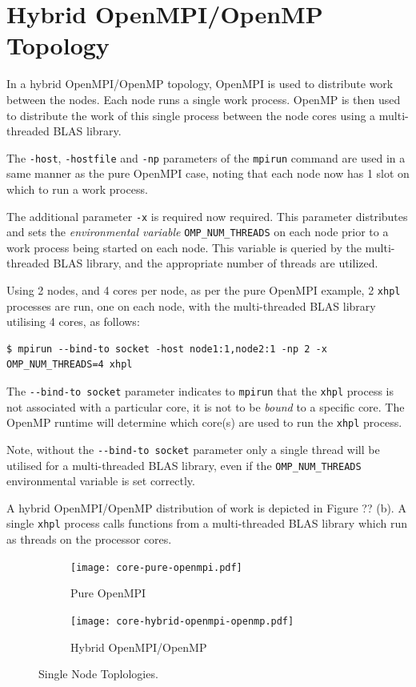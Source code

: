 \documentclass{report}
\begin{document}
%
%
\section{Hybrid OpenMPI/OpenMP Topology}
In a hybrid OpenMPI/OpenMP topology, OpenMPI is used to distribute work between the nodes. Each node runs a single work process. OpenMP is then used to distribute the work of this single process between the node cores using a multi-threaded BLAS library.

The \verb|-host|, \verb|-hostfile| and \verb|-np| parameters of the \verb|mpirun| command are used in a same manner as the pure OpenMPI case, noting that each node now has 1 slot on which to run a work process.

The additional parameter \verb|-x| is required now required. This parameter distributes and sets the \emph{environmental variable} \verb|OMP_NUM_THREADS| on each node prior to a work process being started on each node. This variable is queried by the multi-threaded BLAS library, and the appropriate number of threads are utilized.

Using 2 nodes, and 4 cores per node, as per the pure OpenMPI example, 2 \verb|xhpl| processes are run, one on each node, with the multi-threaded BLAS library utilising 4 cores, as follows:

\lstset{style=type}
\begin{lstlisting}
$ mpirun --bind-to socket -host node1:1,node2:1 -np 2 -x OMP_NUM_THREADS=4 xhpl
\end{lstlisting}

The \verb|--bind-to socket| parameter indicates to \verb|mpirun| that the \verb|xhpl| process is not associated with a particular core, it is not to be \emph{bound} to a specific core. The OpenMP runtime will determine which core(s) are used to run the \verb|xhpl| process.

Note, without the \verb|--bind-to socket| parameter only a single thread will be utilised for a multi-threaded BLAS library, even if the \verb|OMP_NUM_THREADS| environmental variable is set correctly.

A hybrid OpenMPI/OpenMP distribution of work is depicted in Figure ?? (b). A single \verb|xhpl| process calls functions from a multi-threaded BLAS library which run as threads on the processor cores.

\begin{figure}
	\begin{subfigure}{1.0\textwidth}
		\centering
		\texttt{[image: core-pure-openmpi.pdf]}
		\caption{Pure OpenMPI}
		\label{fig:subim1}
	\end{subfigure}
	\par\bigskip
	\begin{subfigure}{1.0\textwidth}
		\centering
		\texttt{[image: core-hybrid-openmpi-openmp.pdf]}
		\caption{Hybrid OpenMPI/OpenMP}
		\label{fig:subim2}
	\end{subfigure}
\caption{Single Node Toplologies.}
\label{fig:image2}
\end{figure}
\end{document}
